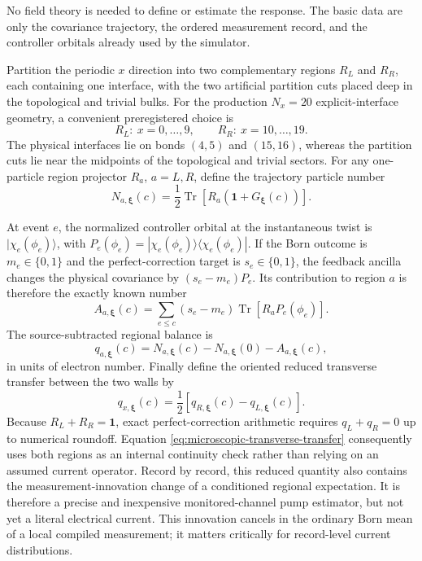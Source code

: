 \documentclass[aps,prb,onecolumn,nofootinbib,superscriptaddress]{revtex4-2}
\newcommand{\Id}{\mathbf{1}}
\newcommand{\Tr}{\operatorname{Tr}}
\newcommand{\bxi}{\bm{\xi}}
\begin{document}
No field theory is needed to define or estimate the response.  The basic data
are only the covariance trajectory, the ordered measurement record, and the
controller orbitals already used by the simulator.

Partition the periodic $x$ direction into two complementary regions $R_L$ and
$R_R$, each containing one interface, with the two artificial partition cuts
placed deep in the topological and trivial bulks.  For the production
$N_x=20$ explicit-interface geometry, a convenient preregistered choice is
\begin{equation}
  R_L:\ x=0,\ldots,9,
  \qquad
  R_R:\ x=10,\ldots,19.
  \label{eq:hall-regions}
\end{equation}
The physical interfaces lie on bonds $(4,5)$ and $(15,16)$, whereas the
partition cuts lie near the midpoints of the topological and trivial sectors.
For any one-particle region projector $R_a$, $a=L,R$, define the trajectory
particle number
\begin{equation}
  N_{a,\bxi}(c)
  =\frac12\Tr\!\left[R_a(\Id+G_{\bxi}(c))\right].
  \label{eq:regional-particle-number}
\end{equation}

At event $e$, the normalized controller orbital at the instantaneous twist is
$|\chi_e(\phi_e)\rangle$, with
$P_e(\phi_e)=|\chi_e(\phi_e)\rangle\langle\chi_e(\phi_e)|$.  If the Born
outcome is $m_e\in\{0,1\}$ and the perfect-correction target is
$s_e\in\{0,1\}$, the feedback ancilla changes the physical covariance by
$(s_e-m_e)P_e$.  Its contribution to region $a$ is therefore the exactly
known number
\begin{equation}
  A_{a,\bxi}(c)
  =\sum_{e\le c}(s_e-m_e)
    \Tr\!\left[R_aP_e(\phi_e)\right].
  \label{eq:microscopic-ancilla-source}
\end{equation}
The source-subtracted regional balance is
\begin{equation}
  q_{a,\bxi}(c)
  =N_{a,\bxi}(c)-N_{a,\bxi}(0)-A_{a,\bxi}(c),
  \label{eq:microscopic-region-flow}
\end{equation}
in units of electron number.  Finally define the oriented reduced transverse transfer
between the two walls by
\begin{equation}
  q_{x,\bxi}(c)
  =\frac12\left[q_{R,\bxi}(c)-q_{L,\bxi}(c)\right].
  \label{eq:microscopic-transverse-transfer}
\end{equation}
Because $R_L+R_R=\Id$, exact perfect-correction arithmetic requires
$q_L+q_R=0$ up to numerical roundoff.  Equation
\eqref{eq:microscopic-transverse-transfer} consequently uses both regions as
an internal continuity check rather than relying on an assumed current
operator.  Record by record, this reduced quantity also contains the
measurement-innovation change of a conditioned regional expectation.  It is
therefore a precise and inexpensive monitored-channel pump estimator, but not
yet a literal electrical current.  This innovation cancels in the ordinary
Born mean of a local compiled measurement; it matters critically for
record-level current distributions.
\end{document}
